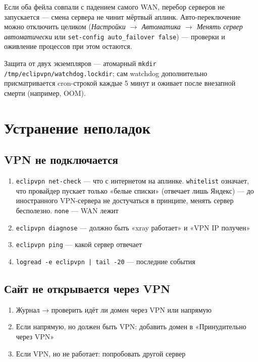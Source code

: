 \documentclass[11pt,a4paper]{article}
\begin{document}
Если оба фейла совпали с падением самого WAN, перебор серверов не запускается --- смена сервера не чинит мёртвый аплинк. Авто-переключение можно отключить целиком (\emph{Настройки $\rightarrow$ Автоматика $\rightarrow$ Менять сервер автоматически} или \texttt{set-config auto\_failover false}) --- проверки и оживление процессов при этом остаются.

Защита от двух экземпляров --- атомарный \texttt{mkdir /tmp/eclipvpn/watchdog.lockdir}; сам watchdog дополнительно присматривается cron-строкой каждые 5 минут и оживает после внезапной смерти (например, OOM).

\section{Устранение неполадок}

\subsection{VPN не подключается}

\begin{enumerate}
\item \texttt{eclipvpn net-check} — что с интернетом на аплинке. \texttt{whitelist} означает, что провайдер пускает только «белые списки» (отвечает лишь Яндекс) — до иностранного VPN-сервера не достучаться в принципе, менять сервер бесполезно. \texttt{none} — WAN лежит
\item \texttt{eclipvpn diagnose} — должно быть «xray работает» и «VPN IP получен»
\item \texttt{eclipvpn ping} — какой сервер отвечает
\item \texttt{logread -e eclipvpn | tail -20} — последние события
\end{enumerate}

\subsection{Сайт не открывается через VPN}

\begin{enumerate}
\item Журнал → проверить идёт ли домен через VPN или напрямую
\item Если напрямую, но должен быть VPN: добавить домен в «Принудительно через VPN»
\item Если VPN, но не работает: попробовать другой сервер
\end{enumerate}
\end{document}
